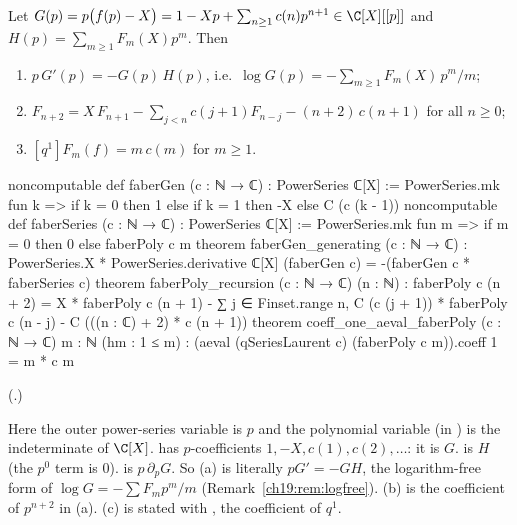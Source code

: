 \begin{theorem}\label{ch19:thm:fabergen}
Let $G(p)=p\bigl(f(p)-X\bigr)=1-Xp+\sum_{n\ge1}c(n)p^{n+1}\in\C[X][[p]]$ and $H(p)=\sum_{m\ge1}F_m(X)p^m$.  Then
\begin{enumerate}[label=(\alph*)]
\item $p\,G'(p)=-G(p)\,H(p)$, i.e.\ $\log G(p)=-\sum_{m\ge1}F_m(X)\,p^m/m$;
\item $F_{n+2}=X\,F_{n+1}-\sum_{j<n}c(j+1)F_{n-j}-(n+2)\,c(n+1)$ for all $n\ge0$;
\item $[q^1]F_m(f)=m\,c(m)$ for $m\ge1$.
\end{enumerate}
\end{theorem}
\begin{leancode}
noncomputable def faberGen (c : ℕ → ℂ) : PowerSeries ℂ[X] :=
  PowerSeries.mk fun k => if k = 0 then 1 else if k = 1 then -X else C (c (k - 1))
noncomputable def faberSeries (c : ℕ → ℂ) : PowerSeries ℂ[X] :=
  PowerSeries.mk fun m => if m = 0 then 0 else faberPoly c m
theorem faberGen_generating (c : ℕ → ℂ) :
    PowerSeries.X * PowerSeries.derivative ℂ[X] (faberGen c) = -(faberGen c * faberSeries c)
theorem faberPoly_recursion (c : ℕ → ℂ) (n : ℕ) :
    faberPoly c (n + 2) =
      X * faberPoly c (n + 1) - ∑ j ∈ Finset.range n, C (c (j + 1)) * faberPoly c (n - j) -
        C (((n : ℂ) + 2) * c (n + 1))
theorem coeff_one_aeval_faberPoly (c : ℕ → ℂ) {m : ℕ} (hm : 1 ≤ m) :
    (aeval (qSeriesLaurent c) (faberPoly c m)).coeff 1 = m * c m
\end{leancode}
(.)
\begin{dictionary}
Here the outer power-series variable  is $p$ and the polynomial variable  (in )
is the indeterminate of $\C[X]$.   has $p$-coefficients $1,-X,c(1),c(2),\dots$: it is $G$.
 is $H$ (the $p^0$ term is $0$).  
is $p\,\partial_pG$.  So (a) is literally $pG'=-GH$, the logarithm-free form of $\log G=-\sum F_mp^m/m$
(Remark~\ref{ch19:rem:logfree}).  (b) is the coefficient of $p^{n+2}$ in (a).  (c) is stated with , the
coefficient of $q^1$.
\end{dictionary}
